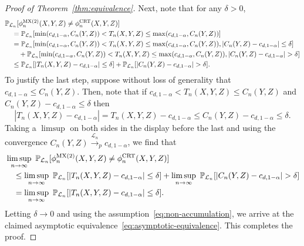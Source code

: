 \documentclass[12pt]{article}
\theoremstyle{definition}
\theoremstyle{remark}
\newcommand{\srx}{X}
\newcommand{\srz}{Z}
\newcommand{\sry}{Y}
\begin{document}
\begin{proof}[Proof of Theorem~\ref{thm:equivalence}]
	Next, note that for any $\delta > 0$,
	\small
	\begin{equation*}
		\begin{split}
			&\mathbb P_{\mathcal L_n}[\phi^{\textnormal{MX(2)}}_n(\srx, \sry, \srz) \neq \phi^{\textnormal{CRT}}_n(\srx, \sry, \srz)] \\
			&\quad = \mathbb P_{\mathcal L_n}[\min(c_{d,1-\alpha},C_n(\sry, \srz))  < T_n(\srx, \sry, \srz) \leq \max(c_{d,1-\alpha},C_n(\sry, \srz))] \\
			&\quad=\mathbb P_{\mathcal L_n}[\min(c_{d,1-\alpha},C_n(\sry, \srz))  < T_n(\srx, \sry, \srz) \leq \max(c_{d,1-\alpha},C_n(\sry, \srz)), |C_n(\sry, \srz)-c_{d,1-\alpha}| \leq \delta] \\
			&\quad \quad +  \mathbb P_{\mathcal L_n}[\min(c_{d,1-\alpha},C_n(\sry, \srz))  < T_n(\srx, \sry, \srz) \leq \max(c_{d,1-\alpha},C_n(\sry, \srz)), |C_n(\sry, \srz)-c_{d,1-\alpha}| > \delta]\\
			&\quad\leq \mathbb P_{\mathcal L_n}[|T_n(\srx, \sry, \srz)-c_{d,1-\alpha}| \leq \delta] + \mathbb P_{\mathcal L_n}[|C_n(\sry, \srz)-c_{d,1-\alpha}| > \delta].
		\end{split}
	\end{equation*}
	\normalsize
	To justify the last step, suppose without loss of generality that $c_{d,1-\alpha} \leq C_n(\sry, \srz)$. Then, note that if $c_{d,1-\alpha} < T_n(\srx, \sry, \srz) \leq C_n(\sry, \srz)$ and $C_n(\sry, \srz)-c_{d,1-\alpha} \leq \delta$ then
	\begin{equation*}
		|T_n(\srx, \sry,\srz)-c_{d,1-\alpha}| = T_n(\srx, \sry,\srz)-c_{d,1-\alpha} \leq C_n(\sry, \srz)- c_{d,1-\alpha} \leq \delta.
	\end{equation*}
	Taking a $\limsup$ on both sides in the display before the last and using the convergence $C_n(\sry,\srz)  \overset{\mathcal L_n}\rightarrow_p c_{d,1-\alpha}$, we find that
	\begin{equation*}
		\begin{split}
			&\limsup_{n \rightarrow \infty}\ \mathbb P_{\mathcal L_n}[\phi^{\textnormal{MX(2)}}_n(\srx, \sry, \srz) \neq \phi^{\textnormal{CRT}}_n(\srx, \sry, \srz)] \\
			&\quad \leq \limsup_{n \rightarrow \infty}\ \mathbb P_{\mathcal L_n}[|T_n(\srx, \sry, \srz)-c_{d,1-\alpha}| \leq \delta]+ \limsup_{n \rightarrow \infty}\ \mathbb P_{\mathcal L_n}[|C_n(\sry, \srz)-c_{d,1-\alpha}| > \delta] \\
			&\quad = \limsup_{n \rightarrow \infty}\ \mathbb P_{\mathcal L_n}[|T_n(\srx, \sry, \srz)-c_{d,1-\alpha}| \leq \delta].
		\end{split}
	\end{equation*}
	Letting $\delta \rightarrow 0$ and using the assumption~\eqref{eq:non-accumulation}, we arrive at the claimed asymptotic equivalence~\eqref{eq:asymptotic-equivalence}. This completes the proof.
\end{proof}
\end{document}
